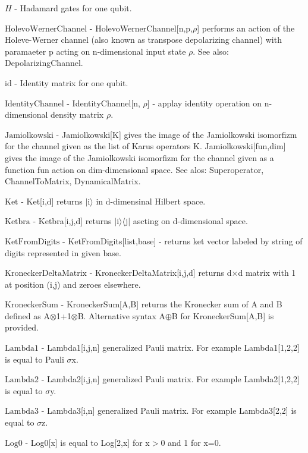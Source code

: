 \documentclass[a4paper,12pt]{article}
\begin{document}
\textbf{$ H $ } - Hadamard gates for one qubit.$  $

\textbf{$ \text{HolevoWernerChannel} $ } - HolevoWernerChannel[n,p,$\rho $] performs an action of the Holeve-Werner channel (also known as transpose depolarizing channel) with paramaeter p acting on n-dimensional input state $\rho $. See also: DepolarizingChannel.$  $

\textbf{$ \text{id} $ } - Identity matrix for one qubit.$  $

\textbf{$ \text{IdentityChannel} $ } - IdentityChannel[n, $\rho $] - applay identity operation on n-dimensional density matrix $\rho $.$  $

\textbf{$ \text{Jamiolkowski} $ } - Jamiolkowski[K] gives the image of the Jamiolkowski isomorfizm for the channel given as the list of Karus operators K. Jamiolkowski[fun,dim] gives the image of the Jamiolkowski isomorfizm for the channel given as a function fun action on dim-dimensional space. See alos: Superoperator, ChannelToMatrix, DynamicalMatrix.$  $

\textbf{$ \text{Ket} $ } - Ket[i,d] returns $|$i$\rangle $ in d-dimensinal Hilbert space.$  $

\textbf{$ \text{Ketbra} $ } - Ketbra[i,j,d] returns $|$i$\rangle \langle $j$|$ ascting on d-dimensional space.$  $

\textbf{$ \text{KetFromDigits} $ } - KetFromDigits[list,base] - returns ket vector labeled by string of digits represented in given base.$  $

\textbf{$ \text{KroneckerDeltaMatrix} $ } - KroneckerDeltaMatrix[i,j,d] returns d$\times $d matrix with 1 at position (i,j) and zeroes elsewhere.$  $

\textbf{$ \text{KroneckerSum} $ } - KroneckerSum[A,B] returns the Kronecker sum of A and B defined as A$\otimes $1+1$\otimes $B. Alternative syntax A$\oplus $B for KroneckerSum[A,B] is provided.$  $

\textbf{$ \text{Lambda1} $ } - Lambda1[i,j,n] generalized Pauli matrix. For example Lambda1[1,2,2] is equal to Pauli $\sigma $x.$  $

\textbf{$ \text{Lambda2} $ } - Lambda2[i,j,n] generalized Pauli matrix. For example Lambda2[1,2,2] is equal to $\sigma $y.$  $

\textbf{$ \text{Lambda3} $ } - Lambda3[i,n] generalized Pauli matrix. For example Lambda3[2,2] is equal to $\sigma $z.$  $

\textbf{$ \text{Log0} $ } - Log0[x] is equal to Log[2,x] for x$>$0 and 1 for x=0.$  $
\end{document}
